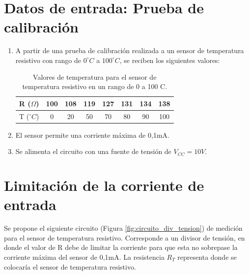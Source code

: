 \documentclass[journal,trans]{IEEEtran}
\begin{document}



\section{Datos de entrada: Prueba de calibración}
\begin{enumerate}
    \item A partir de una prueba de calibración realizada a un sensor de temperatura resistivo con rango de $0^{\circ}C$ a $100^{\circ}C$, se reciben los siguientes valores:

\begin{table}[htb]
    \begin{center}
        \caption{Valores de temperatura para el sensor de temperatura resistivo en un rango de 0 a 100 C.}
        \label{tab:prueba_calibracion}
        \begin{tabular}{c | c | c | c | c | c | c | c}
            \hline
            R ($\Omega$) & 100 & 108 & 119 & 127 & 131 & 134 & 138 \\
            \hline
            T ($^{\circ}C$) & 0 & 20 & 50 & 70 & 80 & 90 & 100  \\
            \hline
        \end{tabular}
    \end{center}
\end{table}

    \item El sensor permite una corriente máxima de 0,1mA.

    \item Se alimenta el circuito con una fuente de tensión de $V_{CC} = 10 V$.

\end{enumerate}

\section{Limitación de la corriente de entrada}
Se propone el siguiente circuito (Figura \ref{fig:circuito_div_tension}) de medición para el sensor de temperatura resistivo. Corresponde a un divisor de tensión, en donde el valor de R debe de limitar la corriente para que esta no sobrepase la corriente máxima del sensor de 0,1mA. La resistencia $R_{T}$ representa donde se colocaría el sensor de temperatura resistivo.
\end{document}
